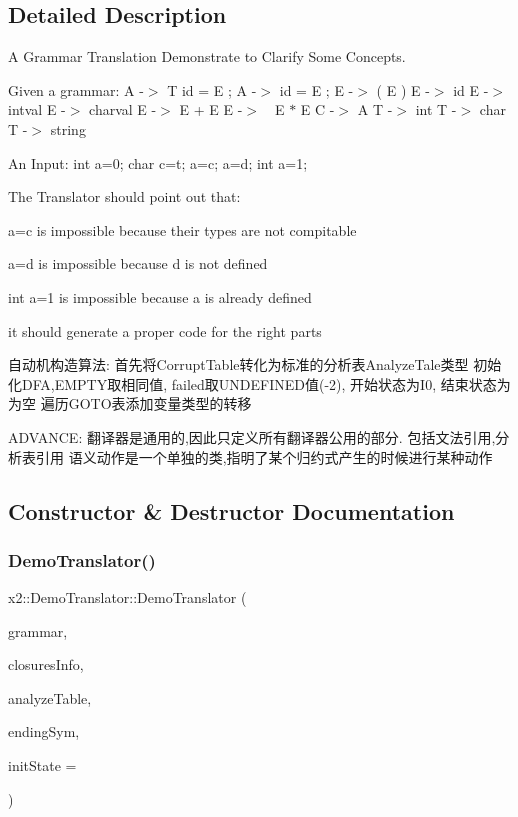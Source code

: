 \subsection{Detailed Description}
A Grammar Translation Demonstrate to Clarify Some Concepts. 

Given a grammar\+: A -\/$>$ T id = E ; A -\/$>$ id = E ; E -\/$>$ ( E ) E -\/$>$ id E -\/$>$ intval E -\/$>$ charval E -\/$>$ E + E E -\/$>$　E $\ast$ E C -\/$>$ A T -\/$>$ int T -\/$>$ char T -\/$>$ string

An Input\+: int a=0; char c=\textquotesingle{}t\textquotesingle{}; a=c; a=d; int a=1;

The Translator should point out that\+:
\begin{DoxyEnumerate}
\item a=c is impossible because their types are not compitable
\item a=d is impossible because d is not defined
\item int a=1 is impossible because a is already defined
\item it should generate a proper code for the right parts
\end{DoxyEnumerate}

自动机构造算法\+: 首先将\+Corrupt\+Table转化为标准的分析表\+Analyze\+Tale类型 初始化\+D\+FA,E\+M\+P\+T\+Y取相同值, failed取\+U\+N\+D\+E\+F\+I\+N\+E\+D值(-\/2), 开始状态为\+I0, 结束状态为为空 遍历\+G\+O\+T\+O表添加变量类型的转移

A\+D\+V\+A\+N\+CE\+: 翻译器是通用的,因此只定义所有翻译器公用的部分. 包括文法引用,分析表引用 语义动作是一个单独的类,指明了某个归约式产生的时候进行某种动作 

\subsection{Constructor \& Destructor Documentation}
\mbox{\label{classx2_1_1_demo_translator_a5c8a3792ff989f0779f49b4b4824a66d}} 
\subsubsection{\texorpdfstring{Demo\+Translator()}{DemoTranslator()}}
{\footnotesize\ttfamily x2\+::\+Demo\+Translator\+::\+Demo\+Translator (\begin{DoxyParamCaption}\item[{const \hyperlink{classx2_1_1_l_r1_gramma}{L\+R1\+Gramma} \&}]{grammar,  }\item[{const L\+R1\+Gramma\+::\+Info\+Type \&}]{closures\+Info,  }\item[{const \hyperlink{classx2_1_1_gramma_a33681053b045219ea58cc68c3faa4975}{L\+R1\+Gramma\+::\+L\+R\+Analyze\+Table\+Type} \&}]{analyze\+Table,  }\item[{int}]{ending\+Sym,  }\item[{int}]{init\+State = {} }\end{DoxyParamCaption})\hspace{0.3cm}{\ttfamily [inline]}}


